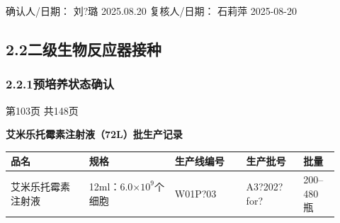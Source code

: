 \documentclass[UTF8,10pt,a4paper,fontset=fandol]{ctexart}
\newcommand{\fieldvalue}[1]{#1}
\newcommand{\handwritten}[1]{#1}
\begin{document}
确认人/日期：
\fieldvalue{\handwritten{刘?璐}}
\quad
\fieldvalue{\handwritten{2025.08.20}}
\hfill
复核人/日期：
\fieldvalue{\handwritten{石莉萍}}
\quad
\fieldvalue{\handwritten{2025-08-20}}

\subsection*{2.2\quad 二级生物反应器接种}

\subsubsection*{2.2.1\quad 预培养状态确认}

\begin{center}
第103页 共148页
\end{center}

\newpage

\begin{center}
\textbf{艾米乐托霉素注射液（72L）批生产记录}
\end{center}

\begin{tabular}{|p{0.22\linewidth}|p{0.24\linewidth}|p{0.20\linewidth}|p{0.16\linewidth}|p{0.10\linewidth}|}
\hline
品名 & 规格 & 生产线编号 & 生产批号 & 批量 \\
\hline
艾米乐托霉素注射液 & 12ml：6.0$\times 10^{9}$个细胞 &
\fieldvalue{\handwritten{W01P?03}} &
\fieldvalue{\handwritten{A3?202?for?}} &
200--480 瓶 \\
\hline
\end{tabular}
\end{document}
